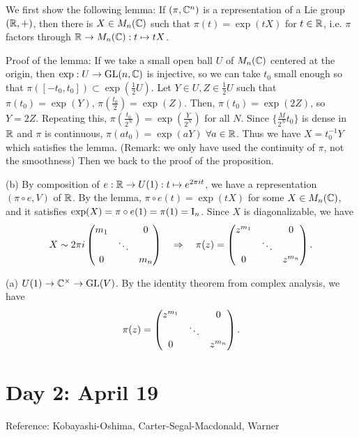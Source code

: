 \documentclass{../../small}
\begin{document}
\begin{pf}
We first show the following lemma: 
If $(\pi,\mathbb{C}^n)$ is a representation of a Lie group $(\mathbb{R},+)$, then there is $X\in M_n(\mathbb{C})$ such that $\pi(t)=\exp(tX)$ for $t\in\mathbb{R}$, i.e. $\pi$ factors through $\mathbb{R}\to M_n(\mathbb{C}):t\mapsto tX$.

Proof of the lemma:
If we take a small open ball $U$ of $M_n(\mathbb{C})$ centered at the origin, then $\exp:U\to\mathrm{GL}(n,\mathbb{C})$ is injective, so we can take $t_0$ small enough so that $\pi([-t_0,t_0])\subset\exp(\frac12U)$.
Let $Y\in U,Z\in\frac12U$ such that $\pi(t_0)=\exp(Y)$, $\pi(\frac{t_0}2)=\exp(Z)$.
Then, $\pi(t_0)=\exp(2Z)$, so $Y=2Z$.
Repeating this, $\pi(\frac{t_0}{2^N})=\exp(\frac{Y}{2^N})$ for all $N$.
Since $\{\frac{M}{2^N}t_0\}$ is dense in $\mathbb{R}$ and $\pi$ is continuous, $\pi(at_0)=\exp(aY)$ $\forall a\in\mathbb{R}$.
Thus we have $X=t_0^{-1}Y$ which satisfies the lemma.
(Remark: we only have used the continuity of $\pi$, not the smoothness)
Then we back to the proof of the proposition.

(b)
By composition of $e:\mathbb{R}\to U(1):t\mapsto e^{2\pi it}$, we have a representation $(\pi\circ e,V)$ of $\mathbb{R}$.
By the lemma, $\pi\circ e(t)=\exp(tX)$ for some $X\in M_n(\mathbb{C})$, and it satisfies $\exp(X)=\pi\circ e(1)=\pi(1)=\mathrm{I}_n$.
Since $X$ is diagonalizable, we have
\[X\sim2\pi i\begin{pmatrix}m_1&&0\\&\ddots&\\0&&m_n\end{pmatrix}\quad\Rightarrow\quad\pi(z)=\begin{pmatrix}z^{m_1}&&0\\&\ddots&\\0&&z^{m_n}\end{pmatrix}.\]

(a)
$U(1)\to\mathbb{C}^\times\to\mathrm{GL}(V)$.
By the identity theorem from complex analysis, we have
\[\pi(z)=\begin{pmatrix}z^{m_1}&&0\\&\ddots&\\0&&z^{m_n}\end{pmatrix}.\]
\end{pf}

\section{Day 2: April 19}
Reference: Kobayashi-Oshima, Carter-Segal-Macdonald, Warner
\end{document}
